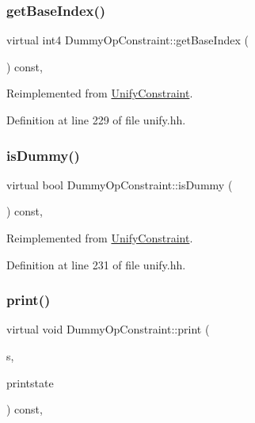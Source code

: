 \subsubsection{\texorpdfstring{getBaseIndex()}{getBaseIndex()}}
{\footnotesize\ttfamily virtual int4 Dummy\+Op\+Constraint\+::get\+Base\+Index (\begin{DoxyParamCaption}\item[{void}]{ }\end{DoxyParamCaption}) const\hspace{0.3cm}{\ttfamily [inline]}, {\ttfamily [virtual]}}



Reimplemented from \mbox{\hyperlink{class_unify_constraint_a44f0164f38ac1fdc44fc73ebe7678de1}{Unify\+Constraint}}.



Definition at line 229 of file unify.\+hh.

\mbox{\label{class_dummy_op_constraint_a2153d437eb36b8f726b63d25dc7c3a09}} 
\subsubsection{\texorpdfstring{isDummy()}{isDummy()}}
{\footnotesize\ttfamily virtual bool Dummy\+Op\+Constraint\+::is\+Dummy (\begin{DoxyParamCaption}\item[{void}]{ }\end{DoxyParamCaption}) const\hspace{0.3cm}{\ttfamily [inline]}, {\ttfamily [virtual]}}



Reimplemented from \mbox{\hyperlink{class_unify_constraint_a260263ddd2fea5ac847302d12feeb031}{Unify\+Constraint}}.



Definition at line 231 of file unify.\+hh.

\mbox{\label{class_dummy_op_constraint_a39e037049025cf469bd939cc26b4e66c}} 
\subsubsection{\texorpdfstring{print()}{print()}}
{\footnotesize\ttfamily virtual void Dummy\+Op\+Constraint\+::print (\begin{DoxyParamCaption}\item[{ostream \&}]{s,  }\item[{\mbox{\hyperlink{class_unify_c_printer}{Unify\+C\+Printer}} \&}]{printstate }\end{DoxyParamCaption}) const\hspace{0.3cm}{\ttfamily [inline]}, {\ttfamily [virtual]}}



